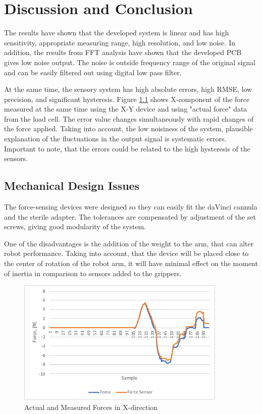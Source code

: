 \chapter{Discussion and Conclusion}
\label{discuss} %

The results have shown that the developed system is linear and has high sensitivity, appropriate measuring range, high resolution, and low noise. In addition, the results from FFT analysis have shown that the developed PCB gives low noise output. The noise is outside frequency range of the original signal and can be easily filtered out using digital low pass filter.

At the same time, the sensory system has high absolute errors, high RMSE, low precision, and significant hysteresis. Figure \ref{fig:Syst_err} shows X-component of the force measured at the same time using the X-Y device and using "actual force" data from the load cell. The error value changes simultaneously with rapid changes of the force applied. Taking into account, the low noisiness of the system, plausible explanation of the fluctuations in the output signal is systematic errors. Important to note, that the errors could be related to the high hysteresis of the sensors.

\section{Mechanical Design Issues}

The force-sensing devices were designed so they can easily fit the daVinci cannula and the sterile adapter. The tolerances are compensated by adjustment of the set screws, giving good modularity of the system.

One of the disadvantages is the addition of the weight to the arm, that can alter robot performance. Taking into account, that the device will be placed close to the center of rotation of the robot arm, it will have minimal effect on the moment of inertia in comparison to sensors added to the grippers.

\begin{figure}[h]
	\begin{center}
	\includegraphics[width=100mm]{fig/results/syst_error.pdf}
	\end{center}
	\vspace{-4mm}
	\caption[Actual and Measured Forces in X-direction]
	{Actual and Measured Forces in X-direction}
	\label{fig:Syst_err}
	\vspace{-2mm}
\end{figure}

